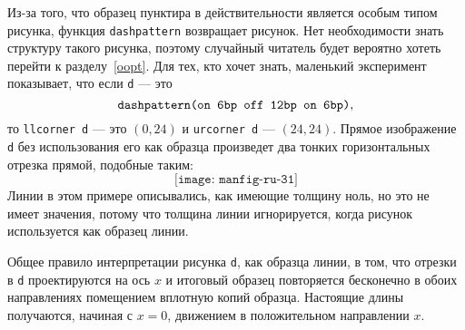 \documentclass{article} %
\begin{document}
Из-за того, что образец пунктира в действительности является особым типом 
рисунка, функция {\tt dashpattern} возвращает рисунок.
Нет необходимости знать структуру такого рисунка, поэтому случайный 
читатель будет вероятно хотеть перейти к разделу~\ref{oopt}. 
Для тех, кто хочет знать, маленький эксперимент показывает, что если 
{\tt d} --- это 
$$ \hbox{\tt dashpattern(on 6bp  off 12bp  on 6bp)}, $$
то {\tt llcorner d} --- это $(0,24)$ и {\tt urcorner d} --- $(24,24)$.
Прямое изображение {\tt d} без использования его как образца 
произведет два тонких горизонтальных отрезка прямой, подобные таким:
$$ \texttt{[image: manfig-ru-31]} $$
Линии в этом примере описывались, как имеющие толщину ноль, но это не имеет 
значения, потому что толщина линии игнорируется, когда рисунок используется 
как образец линии.

Общее правило интерпретации рисунка {\tt d}, как образца линии, в том, 
что отрезки в {\tt d} проектируются на ось $x$ и итоговый образец 
повторяется бесконечно в обоих направлениях помещением вплотную копий 
образца.
Настоящие длины получаются, начиная с $x=0$, движением в положительном 
направлении $x$.
\end{document}
